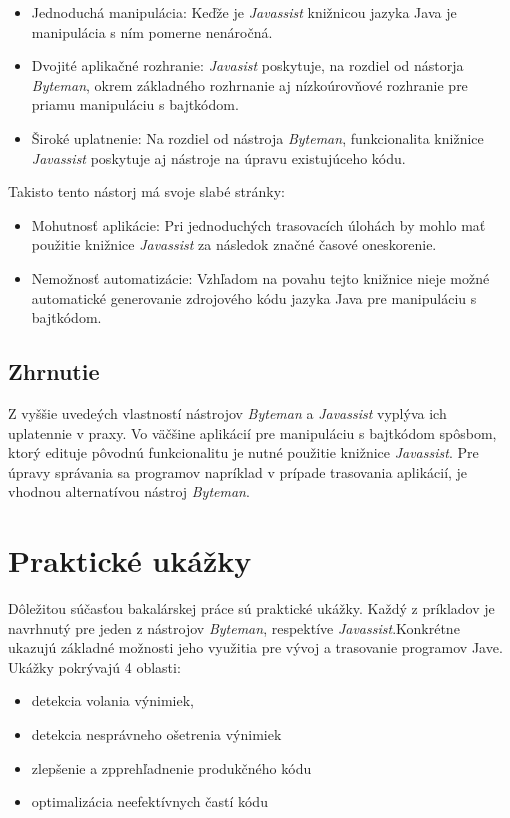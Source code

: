 \documentclass[11pt,final,oneside]{fithesis}
\begin{document}
\begin{itemize}
\item Jednoduchá manipulácia: Keďže je \textit{Javassist} knižnicou jazyka Java je manipulácia s ním pomerne nenáročná.
\item Dvojité aplikačné rozhranie: \textit{Javasist} poskytuje, na rozdiel od nástorja \textit{Byteman}, okrem základného rozhrnanie aj nízkoúrovňové rozhranie pre priamu manipuláciu s bajtkódom.
\item Široké uplatnenie: Na rozdiel od nástroja \textit{Byteman}, funkcionalita knižnice \textit{Javassist} poskytuje aj nástroje na úpravu existujúceho kódu.
\end{itemize}

Takisto tento nástorj má svoje slabé stránky:

\begin{itemize}
\item Mohutnosť aplikácie: Pri jednoduchých trasovacích úlohách by mohlo mať použitie knižnice \textit{Javassist} za následok značné časové oneskorenie.
\item Nemožnosť automatizácie: Vzhľadom na povahu tejto knižnice nieje možné automatické generovanie zdrojového kódu jazyka Java pre manipuláciu s bajtkódom.
\end{itemize}

\section{Zhrnutie}

Z vyššie uvedeých vlastností nástrojov \textit{Byteman} a \textit{Javassist} vyplýva ich uplatennie v praxy. Vo väčšine aplikácií pre manipuláciu s bajtkódom spôsbom, ktorý edituje pôvodnú funkcionalitu je nutné použitie knižnice \textit{Javassist}. Pre úpravy správania sa programov napríklad v prípade trasovania aplikácií, je vhodnou alternatívou nástroj \textit{Byteman}.

\chapter{Praktické ukážky}
Dôležitou súčasťou bakalárskej práce sú praktické ukážky. Každý z príkladov je navrhnutý pre jeden z nástrojov \textit{Byteman}, respektíve \textit{Javassist}.Konkrétne ukazujú základné možnosti jeho využitia pre vývoj a trasovanie programov Jave. Ukážky pokrývajú 4 oblasti:

\begin{itemize}
\item detekcia volania výnimiek, 
\item detekcia nesprávneho ošetrenia výnimiek
\item zlepšenie a zpprehľadnenie produkčného kódu
\item optimalizácia neefektívnych častí kódu
\end{itemize}
\end{document}
